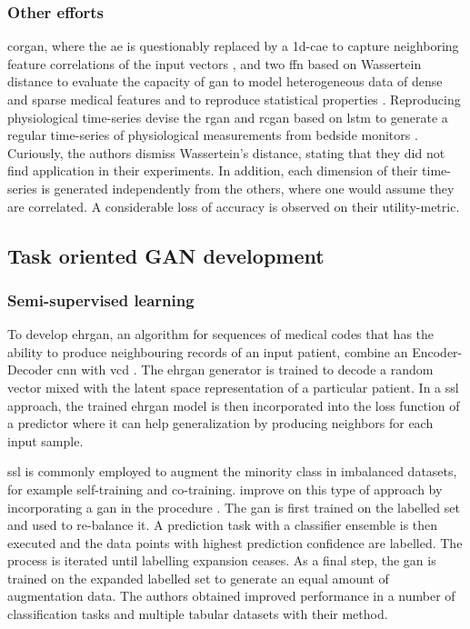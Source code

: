         \subsubsection{Other efforts}
            
            \gls{corgan}, where the \gls{ae} is questionably replaced by a \gls{1d-cae} to capture neighboring feature correlations of the input vectors \cite{torfi2019generating}, and two \gls{ffn} based on Wassertein distance to evaluate the capacity of \gls{gan} to model heterogeneous data of dense and sparse medical features \cite{chincheong2020generation} and to reproduce statistical properties \cite{ozyigit2020generation}. Reproducing physiological time-series \citeauthor{esteban2017real} devise the \gls{rgan} and \gls{rcgan} based on \gls{lstm} to generate a regular time-series of physiological measurements from bedside monitors \cite{esteban2017real}. Curiously, the authors dismiss Wassertein's distance, stating that they did not find application in their experiments. In addition, each dimension of their time-series is generated independently from the others, where one would assume they are correlated. A considerable loss of accuracy is observed on their \gls{utility-metric}.

    \subsection{Task oriented GAN development}
        \subsubsection{Semi-supervised learning}

            To develop \gls{ehrgan}, an algorithm for sequences of medical codes that has the ability to produce neighbouring records of an input patient, \citeauthor{Che_2017} combine an Encoder-Decoder \gls{cnn} \cite{Rankin2020} with \gls{vcd} \cite{Che_2017}. The \gls{ehrgan} generator is trained to decode a random vector mixed with the latent space representation of a particular patient. In a \gls{ssl} approach, the trained \gls{ehrgan} model is then incorporated into the loss function of a predictor where it can help generalization by producing neighbors for each input sample.\par
            
            \Gls{ssl} is commonly employed to augment the minority class in imbalanced datasets, for example \gls{self-training} and \gls{co-training}. \citeauthor{yang2018unpaired} improve on this type of approach by incorporating a \gls{gan} in the procedure \cite{yang2018unpaired}. The \gls{gan} is first trained on the labelled set and used to re-balance it. A prediction task with a classifier ensemble is then executed and the data points with highest prediction confidence are labelled. The process is iterated until labelling expansion ceases. As a final step, the \gls{gan} is trained on the expanded labelled set to generate an equal amount of augmentation data. The authors obtained improved performance in a number of classification tasks and multiple tabular datasets with their method.
    
